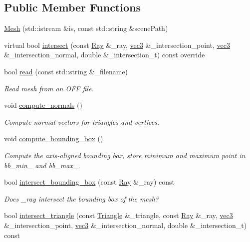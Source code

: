 \subsection*{Public Member Functions}
\begin{DoxyCompactItemize}
\item 
\hyperlink{classMesh_a58ef6d7fa08a5b8eef0c9b97d6c55e0d}{Mesh} (std\+::istream \&is, const std\+::string \&scene\+Path)
\item 
virtual bool \hyperlink{classMesh_a3d982c37d43eb5d3929b2de2b263d662}{intersect} (const \hyperlink{classRay}{Ray} \&\+\_\+ray, \hyperlink{classvec3}{vec3} \&\+\_\+intersection\+\_\+point, \hyperlink{classvec3}{vec3} \&\+\_\+intersection\+\_\+normal, double \&\+\_\+intersection\+\_\+t) const override
\item 
bool \hyperlink{classMesh_a77532d1e9aee1671d4ea38be1ed0d464}{read} (const std\+::string \&\+\_\+filename)
\begin{DoxyCompactList}\small\item\em Read mesh from an O\+FF file. \end{DoxyCompactList}\item 
void \hyperlink{classMesh_a4e9bedfc415b7135c9587f63535fcb6d}{compute\+\_\+normals} ()
\begin{DoxyCompactList}\small\item\em Compute normal vectors for triangles and vertices. \end{DoxyCompactList}\item 
void \hyperlink{classMesh_a303c102fd254ea32b366591aa00f6e8e}{compute\+\_\+bounding\+\_\+box} ()
\begin{DoxyCompactList}\small\item\em Compute the axis-\/aligned bounding box, store minimum and maximum point in bb\+\_\+min\+\_\+ and bb\+\_\+max\+\_\+. \end{DoxyCompactList}\item 
bool \hyperlink{classMesh_a5839749bb09a6bf09c56056016cc11b2}{intersect\+\_\+bounding\+\_\+box} (const \hyperlink{classRay}{Ray} \&\+\_\+ray) const 
\begin{DoxyCompactList}\small\item\em Does {\ttfamily \+\_\+ray} intersect the bounding box of the mesh? \end{DoxyCompactList}\item 
bool \hyperlink{classMesh_a9be7264791ff3de7dbf99f8548fb7725}{intersect\+\_\+triangle} (const \hyperlink{structMesh_1_1Triangle}{Triangle} \&\+\_\+triangle, const \hyperlink{classRay}{Ray} \&\+\_\+ray, \hyperlink{classvec3}{vec3} \&\+\_\+intersection\+\_\+point, \hyperlink{classvec3}{vec3} \&\+\_\+intersection\+\_\+normal, double \&\+\_\+intersection\+\_\+t) const 
\end{DoxyCompactItemize}
